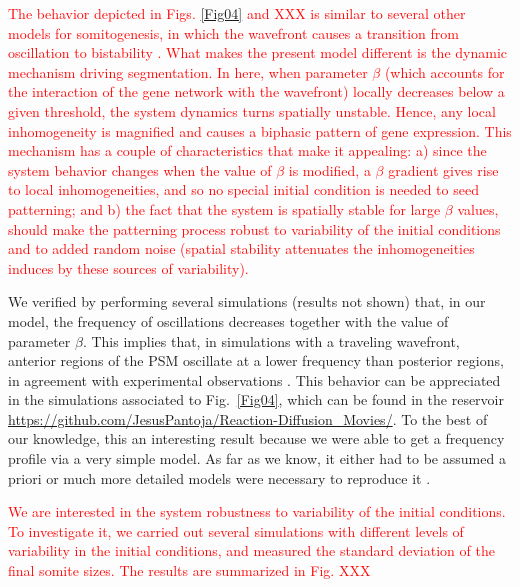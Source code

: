 \documentclass[%
 preprint,
 aip, 
 amsmath,amssymb,
]{revtex4-2}
\begin{document}
\textcolor{red}{The behavior depicted in Figs. \ref{Fig04} and XXX is similar to several other models for somitogenesis, in which the wavefront causes a transition from oscillation to bistability \cite{Francois2007}. What makes the present model different is the dynamic mechanism driving segmentation. In here, when parameter $\beta$ (which accounts for the interaction of the gene network with the wavefront) locally decreases below a given threshold, the system dynamics turns spatially unstable. Hence, any local inhomogeneity is magnified and causes a biphasic pattern of gene expression. This mechanism has a couple of characteristics that make it appealing: a) since the system behavior changes when the value of $\beta$ is modified, a $\beta$ gradient gives rise to local inhomogeneities, and so no special initial condition is needed to seed patterning; and b) the fact that the system is spatially stable for large $\beta$ values, should make the patterning process robust to variability of the initial conditions and to added random noise (spatial stability attenuates the inhomogeneities induces by these sources of variability).}
	
We verified by performing several simulations (results not shown) that, in our model, the frequency of oscillations decreases together with the value of parameter $\beta$. This implies that, in simulations  with a traveling wavefront, anterior regions of the PSM oscillate at a lower frequency than posterior regions, in agreement with experimental observations \cite{Goldbeter2008, Hester2011}. This behavior can be appreciated in the simulations associated to Fig.~\ref{Fig04}, which can be found in the reservoir \url{https://github.com/JesusPantoja/Reaction-Diffusion_Movies/}. To the best of our knowledge, this an interesting result because we were able to get a frequency profile via a very simple model. As far as we know, it either had to be assumed a priori \cite{Morelli2009} or much more detailed models were necessary to reproduce it \cite{Hester2011}.
	
\textcolor{red}{We are interested in the system robustness to variability of the initial conditions. To investigate it, we carried out several simulations with different levels of variability in the initial conditions, and measured the standard deviation of the final somite sizes. The results are summarized in Fig. XXX}
\end{document}
